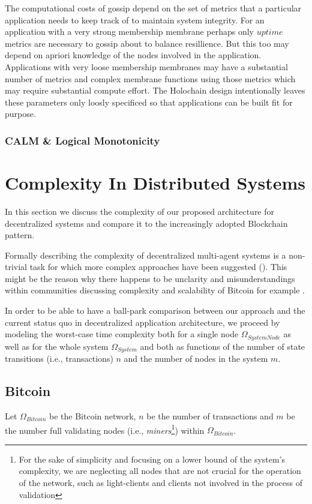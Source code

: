 \documentclass[twocolumn,showpacs,%
  nofootinbib,aps,superscriptaddress,%
  eqsecnum,prd,notitlepage,showkeys,10pt]{revtex4-1}
\begin{document}
The computational costs of gossip depend on the set of metrics that a particular application needs to keep track of to maintain system integrity.  For an application with a very strong membership membrane perhaps only $uptime$ metrics are necessary to gossip about to balance resillience.  But this too may depend on apriori knowledge of the nodes involved in the application.  Applications with very loose membership membranes may have a substantial number of metrics and complex membrane functions using those metrics which may require substantial compute effort.  The Holochain design intentionally leaves these parameters only loosly specificed so that applications can be built fit for purpose.

\subsubsection{CALM \& Logical Monotonicity}


\section{Complexity In Distributed Systems}
\label{sec:complexity}

In this section we discuss the complexity of our proposed architecture for decentralized systems and compare it to the increasingly adopted Blockchain pattern.

Formally describing the complexity of decentralized multi-agent systems is a non-trivial task for which more complex approaches have been suggested (\cite{multi-agent-complex}).
This might be the reason why there happens to be unclarity and misunderstandings within communities discussing complexity and scalability of Bitcoin for example {\cite{bitcoin-complex}}.

In order to be able to have a ball-park comparison between our approach and the current status quo in decentralized application architecture, we proceed by modeling the worst-case time complexity both for a single node $\Omega_{SystemNode}$ as well as for the whole system $\Omega_{System}$ and both as functions of the number of state transitions (i.e., transactions) $n$ and the number of nodes in the system $m$.

\subsection{Bitcoin}
Let $\Omega_{Bitcoin}$ be the Bitcoin network, $n$ be the number of transactions and $m$ be the number full validating nodes (i.e., \textit{miners}\footnote{For the sake of simplicity and focusing on a lower bound of the system's complexity, we are neglecting all nodes that are not crucial for the operation of the network, such as light-clients and clients not involved in the process of validation}) within $\Omega_{Bitcoin}$.
\end{document}
